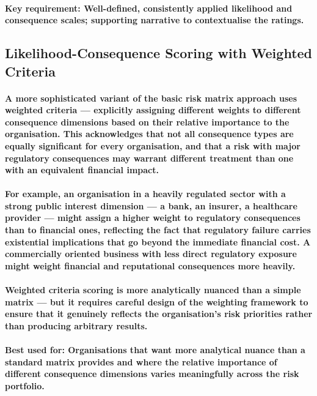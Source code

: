 \paragraph{\textbf{Key requirement}: Well-defined, consistently applied likelihood and consequence scales; supporting narrative to contextualise the ratings.}

\subsection{Likelihood-Consequence Scoring with Weighted Criteria}
\paragraph{A more sophisticated variant of the basic risk matrix approach uses weighted criteria — explicitly assigning different weights to different consequence dimensions based on their relative importance to the organisation. This acknowledges that not all consequence types are equally significant for every organisation, and that a risk with major regulatory consequences may warrant different treatment than one with an equivalent financial impact.}
\paragraph{For example, an organisation in a heavily regulated sector with a strong public interest dimension — a bank, an insurer, a healthcare provider — might assign a higher weight to regulatory consequences than to financial ones, reflecting the fact that regulatory failure carries existential implications that go beyond the immediate financial cost. A commercially oriented business with less direct regulatory exposure might weight financial and reputational consequences more heavily.}
\paragraph{Weighted criteria scoring is more analytically nuanced than a simple matrix — but it requires careful design of the weighting framework to ensure that it genuinely reflects the organisation's risk priorities rather than producing arbitrary results.}
\paragraph{\textbf{Best used for}: Organisations that want more analytical nuance than a standard matrix provides and where the relative importance of different consequence dimensions varies meaningfully across the risk portfolio.}
